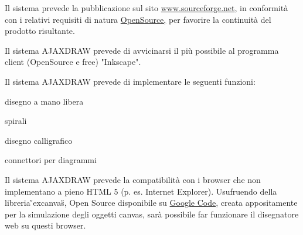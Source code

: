 \begin{elenconumerato}{\subsecindent}
\item Il sistema prevede la pubblicazione sul sito \href{www.sourceforge.net}{www.sourceforge.net}, in conformit\`a con i relativi requisiti di natura \underline{OpenSource,} per favorire la continuit\`a del prodotto risultante.
\end{elenconumerato}

\begin{elenconumerato}{\subsecindent}
\item Il sistema AJAXDRAW prevede di avvicinarsi il pi\`u possibile al programma client (OpenSource e free) "Inkscape". 
\item Il sistema AJAXDRAW prevede di implementare le seguenti funzioni:

\begin{list}{-}{}
\item disegno a mano libera
\item spirali
\item disegno calligrafico
\item connettori per diagrammi
\end{list}

\item Il sistema AJAXDRAW prevede la compatibilit\`a con i browser che non implementano a pieno HTML 5 (p. es. Internet Explorer). Usufruendo della libreria \H{}excanvas\H{}, Open Source disponibile su \href{http://code.google.com/p/explorercanvas/}{Google Code}, creata appositamente per la simulazione degli oggetti canvas, sar\`a possibile far funzionare il disegnatore web su questi browser. 
\end{elenconumerato}


